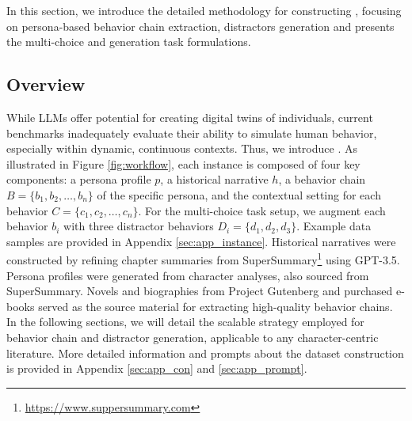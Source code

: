 \label{sec:method}



\label{s:data_construction}
In this section, we introduce the detailed methodology for constructing \datasetname,  focusing on persona-based behavior chain extraction, distractors generation and presents the multi-choice and generation task formulations.

\subsection{Overview}

While LLMs offer potential for creating digital twins of individuals, current benchmarks inadequately evaluate their ability to simulate human behavior, especially within dynamic, continuous contexts. Thus, we introduce \datasetname. 
As illustrated in Figure \ref{fig:workflow}, each \datasetname instance is composed of four key components: a persona profile $p$, a historical narrative $h$, a behavior chain $B=\{b_1,b_2,\dots,b_n\}$ of the specific persona, and the contextual setting for each behavior $C=\{c_1,c_2,\dots,c_n\}$.
For the multi-choice task setup, we 
augment each behavior \( b_i \)
with three distractor behaviors
\( D_i = \{d_1, d_2, d_3\} \).
Example data samples are provided in Appendix \ref{sec:app_instance}.
Historical narratives were constructed by refining chapter summaries from SuperSummary\footnote{\url{https://www.suppersummary.com}} using GPT-3.5.
Persona profiles were generated from character analyses, also sourced from SuperSummary.  Novels and biographies from Project Gutenberg and purchased e-books served as the source material for extracting high-quality behavior chains.  
In the following sections, we will detail the scalable strategy employed for behavior chain and distractor generation, applicable to any character-centric literature. 
More detailed information and prompts about the dataset construction is provided in Appendix \ref{sec:app_con} and \ref{sec:app_prompt}.



